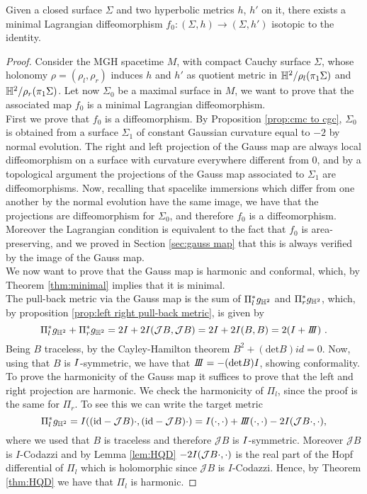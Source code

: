 \begin{theorem}\label{thm:existence}
    Given a closed surface $\Sigma$ and two hyperbolic metrics $h$, $h'$ on it, there exists a minimal Lagrangian diffeomorphism $f_0 : (\Sigma,h) \to (\Sigma,h')$ isotopic to the identity.
\end{theorem}
\begin{proof}
    Consider the MGH spacetime $M$, with compact Cauchy surface $\Sigma$, whose holonomy $\rho = (\rho_l, \rho_r)$ induces $h$ and $h'$ as quotient metric in $\mathbb{H}^2 / \rho_l(\pi_1 \Sigma)$ and $\mathbb{H}^2 / \rho_r(\pi_1 \Sigma)$. Let now $\Sigma_0$ be a maximal surface in $M$, we want to prove that the associated map $f_0$ is a minimal Lagrangian diffeomorphism.\\
    First we prove that $f_0$ is a diffeomorphism. By Proposition \ref{prop:cmc to cgc}, $\Sigma_0$ is obtained from a surface $\Sigma_1$ of constant Gaussian curvature equal to $-2$ by normal evolution. The right and left projection of the Gauss map are always local diffeomorphism on a surface with curvature everywhere different from $0$, and by a topological argument the projections of the Gauss map associated to $\Sigma_1$ are diffeomorphisms. Now, recalling that spacelike immersions which differ from one another by the normal evolution have the same image, we have that the projections are diffeomorphism for $\Sigma_0$, and therefore $f_0$ is a diffeomorphism. Moreover the Lagrangian condition is equivalent to the fact that $f_0$ is area-preserving, and we proved in Section \ref{sec:gauss map} that this is always verified by the image of the Gauss map.\\
    We now want to prove that the Gauss map is harmonic and conformal, which, by Theorem \ref{thm:minimal} implies that it is minimal.\\
    The pull-back metric via the Gauss map is the sum of $\Pi_l^*g_{\mathbb{H}^2}$ and $\Pi_r^*g_{\mathbb{H}^2}$, which, by proposition \ref{prop:left right pull-back metric}, is given by
    \[
       \Pi_l^*g_{\H^2} + \Pi_r^*g_{\H^2} = 2I + 2I(\mathcal{J}B,\mathcal{J}B) = 2I + 2I(B,B)= 2(I+ \III) \ .
    \]
    Being $B$ traceless, by the Cayley-Hamilton theorem $B^2 + (\text{det}B)id = 0$. Now, using that $B$ is $I$-symmetric, we have that $\III = -(\text{det}B)I$, showing conformality.\\
    To prove the harmonicity of the Gauss map it suffices to prove that the left and right projection are harmonic. We check the harmonicity of $\Pi_l$, since the proof is the same for $\Pi_r$. To see this we can write the target metric
    \[
        \Pi_l^*g_{\H^2}=I((\text{id}-\mathcal{J}B)\cdot,(\text{id}-\mathcal{J}B)\cdot) = \I(\cdot, \cdot) + \III(\cdot, \cdot) - 2\I(\mathcal{J}B \cdot, \cdot),
    \]
    where we used that $B$ is traceless and therefore $\mathcal{J}B$ is $I$-symmetric. Moreover $\mathcal{J} B$ is $I$-Codazzi and by Lemma \ref{lem:HQD} $- 2I(\mathcal{J}B \cdot, \cdot)$ is the real part of the Hopf differential of $\Pi_l$ which is holomorphic since $\mathcal{J}B$ is $I$-Codazzi. Hence, by Theorem \ref{thm:HQD} we have that $\Pi_l$ is harmonic.
\end{proof}

